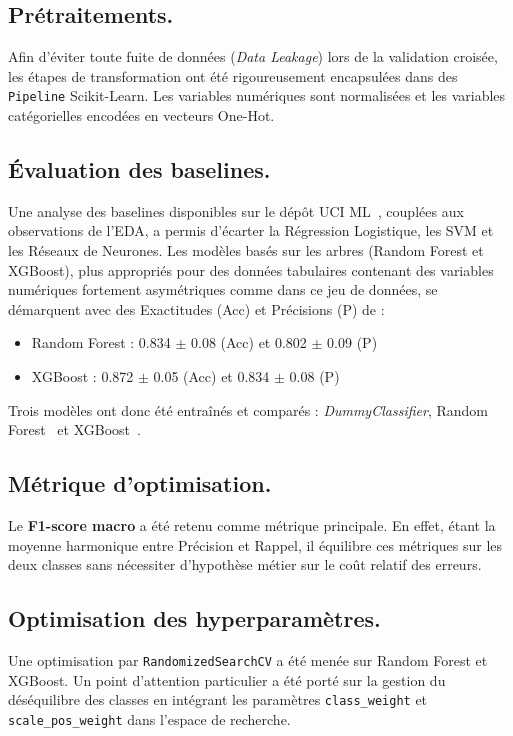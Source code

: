 \documentclass[10pt, a4paper]{article}
\begin{document}
\subsection*{Prétraitements.} 
Afin d'éviter toute fuite de données (\textit{Data Leakage}) lors de la validation croisée, les étapes de transformation ont été rigoureusement encapsulées dans des \texttt{Pipeline} Scikit-Learn. Les variables numériques sont normalisées et les variables catégorielles encodées en vecteurs One-Hot.

\subsection*{Évaluation des baselines.}
Une analyse des baselines disponibles sur le dépôt UCI ML~\cite{adult2}, couplées aux observations de l'EDA, a permis d'écarter la Régression Logistique, les SVM et les Réseaux de Neurones. Les modèles basés sur les arbres (Random Forest et XGBoost), plus appropriés pour des données tabulaires contenant des variables numériques fortement asymétriques comme dans ce jeu de données, se démarquent avec des Exactitudes (Acc) et Précisions (P) de :
\begin{itemize}
\item Random Forest : 0.834 $\pm$ 0.08 (Acc) et 0.802 $\pm$ 0.09 (P)
\item XGBoost : 0.872 $\pm$ 0.05 (Acc) et 0.834 $\pm$ 0.08 (P)
\end{itemize}

\noindent Trois modèles ont donc été entraînés et comparés : \emph{DummyClassifier}, Random Forest~\cite{randomforest} et XGBoost~\cite{xgboost}. 

\subsection*{Métrique d'optimisation.}
Le \textbf{F1-score macro} a été retenu comme métrique principale. En effet, étant la moyenne harmonique entre Précision et Rappel, il équilibre ces métriques sur les deux classes sans nécessiter d'hypothèse métier sur le coût relatif des erreurs.

\subsection*{Optimisation des hyperparamètres.}
Une optimisation par \texttt{RandomizedSearchCV} a été menée sur Random Forest et XGBoost. Un point d'attention particulier a été porté sur la gestion du déséquilibre des classes en intégrant les paramètres \texttt{class\_weight} et \texttt{scale\_pos\_weight} dans l'espace de recherche. 
\end{document}
